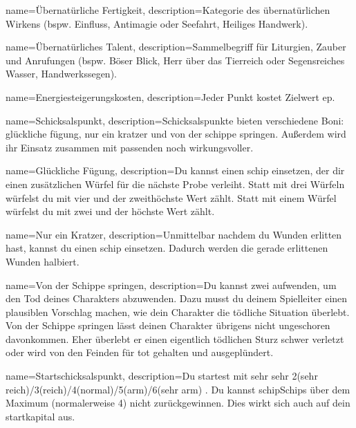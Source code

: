 {
    name={Übernatürliche Fertigkeit},
    description={Kategorie des übernatürlichen Wirkens (bspw. Einfluss, Antimagie oder Seefahrt, Heiliges Handwerk).}}

{
    name={Übernatürliches Talent},
    description={Sammelbegriff für Liturgien, Zauber und Anrufungen (bspw. Böser Blick, Herr über das Tierreich oder Segensreiches Wasser, Handwerkssegen).}}

{
    name={Energiesteigerungskosten},
    description={Jeder Punkt kostet Zielwert \gls{ep}.}}

{
    name={Schicksalspunkt},
    description={Schicksalspunkte bieten verschiedene Boni: \gls{glückliche fügung}, \gls{nur ein kratzer} und \gls{von der schippe springen}. Außerdem wird ihr Einsatz zusammen mit passenden  noch wirkungsvoller.}}

{
    name={Glückliche Fügung},
    description={Du kannst einen \gls{schip} einsetzen, der dir einen zusätzlichen Würfel für die nächste Probe verleiht. Statt mit drei Würfeln würfelst du mit vier und der zweithöchste Wert zählt. Statt mit einem Würfel würfelst du mit zwei und der höchste Wert zählt.}}


{
    name={Nur ein Kratzer},
    description={Unmittelbar nachdem du Wunden erlitten hast, kannst du einen \gls{schip} einsetzen. Dadurch werden die gerade erlittenen Wunden halbiert.}}


{
    name={Von der Schippe springen},
    description={Du kannst zwei  aufwenden, um den Tod deines Charakters abzuwenden. Dazu musst du deinem Spielleiter einen plausiblen Vorschlag machen, wie dein Charakter die tödliche Situation überlebt. Von der Schippe springen lässt deinen Charakter übrigens nicht ungeschoren davonkommen. Eher überlebt er einen eigentlich tödlichen Sturz schwer verletzt oder wird von den Feinden für tot gehalten und ausgeplündert.}}
                

{
    name={Startschicksalspunkt},
    description={Du startest mit sehr sehr 2(sehr reich)/3(reich)/4(normal)/5(arm)/6(sehr arm) . Du kannst \gls{schip}{Schips} über dem Maximum (normalerweise 4) nicht zurückgewinnen. Dies wirkt sich auch auf dein \gls{startkapital} aus.}}
        

